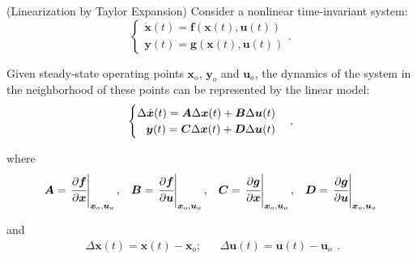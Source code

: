 \documentclass[a4paper,11pt]{book}
\numberwithin{figure}{chapter}
\numberwithin{equation}{chapter}
\numberwithin{table}{chapter}
\newtheorem{theorem}{Theorem}[chapter]
\theoremstyle{definition}
\newcounter{boxed-theorem}
\newenvironment{boxed-theorem}[1]
{\begin{shaded} \begin{theorem}{#1}}
{\end{theorem} \end{shaded}}
\newcounter{boxed-definition}
\begin{document}
\begin{boxed-theorem}{(Linearization by Taylor Expansion)} \label{th:linearization}
    Consider a nonlinear time-invariant system:
    \begin{equation} \label{eq:SSRepr03}
    \begin{cases}
        \dot{\bm{x}}(t) = \bm{f}(\bm{x}(t), \bm{u}(t)) \\
        \bm{y}(t) = \bm{g}(\bm{x}(t), \bm{u}(t))
    \end{cases}
    .\end{equation}
    
    Given steady-state operating points $\bm{x}_o$, $\bm{y}_o$ and $\bm{u}_o$, the dynamics of the system in the neighborhood of these points can be represented by the linear model: 
    \begin{align}
    \begin{cases}
        \Delta \dot{\bm{x}}(t) = \bm{A}\Delta \bm{x}(t) + \bm{B}\Delta \bm{u}(t) & \\
        \hfill \bm{y}(t) = \bm{C}\Delta \bm{x}(t) + \bm{D}\Delta \bm{u}(t) &
    \end{cases}
    ,\end{align}
    
    \noindent where
    \begin{equation}
    \begin{matrix}
        \bm{A} = \left. \cfrac{\partial \bm{f}}{\partial \bm{x}} \right|_{\bm{x}_o, \bm{u}_o}, & \bm{B} = \left. \cfrac{\partial \bm{f}}{\partial \bm{u}} \right|_{\bm{x}_o, \bm{u}_o}, & \bm{C} = \left. \cfrac{\partial \bm{g}}{\partial \bm{x}} \right|_{\bm{x}_o,  \bm{u}_o}, & \bm{D} = \left. \cfrac{\partial \bm{g}}{\partial \bm{u}} \right|_{\bm{x}_o, \bm{u}_o} 
    \end{matrix}
    \end{equation}
    
    \noindent and
    \begin{equation}
    \begin{matrix}
        \Delta \bm{x}(t) = \bm{x}(t) - \bm{x}_o; & & \Delta \bm{u}(t) = \bm{u}(t) - \bm{u}_o
    \end{matrix}
    .\end{equation}
\end{boxed-theorem}
\end{document}
